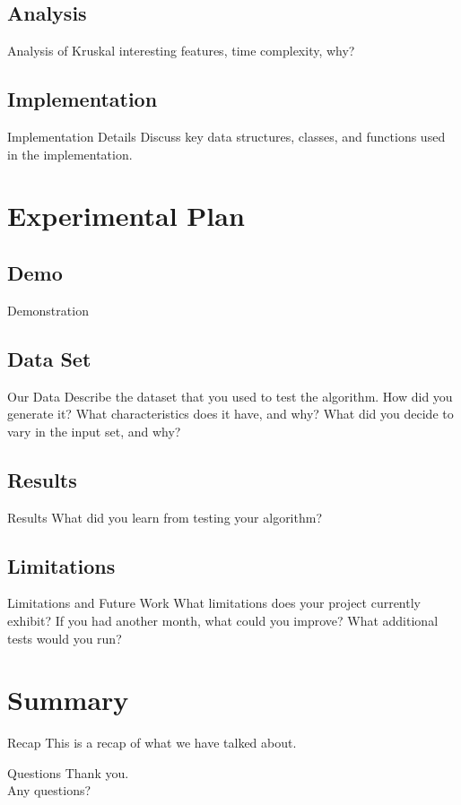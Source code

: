 \documentclass{beamer}
\begin{document}
\subsection{Analysis}
\begin{frame}{Analysis of Kruskal}
    interesting features, time complexity, why?
\end{frame}

\subsection{Implementation}
\begin{frame}{Implementation Details}
    Discuss key data structures, classes, and functions used in the
    implementation.
\end{frame}



\section{Experimental Plan}\frame{\sectionpage}
\subsection{Demo}
\begin{frame}{Demonstration}
\end{frame}

\subsection{Data Set}
\begin{frame}{Our Data}
    Describe the dataset that you used to test the algorithm. How did you
    generate it? What characteristics does it have, and why? What did you
    decide to vary in the input set, and why?
\end{frame}

\subsection{Results}
\begin{frame}{Results}
    What did you learn from testing your algorithm?
\end{frame}

\subsection{Limitations}
\begin{frame}{Limitations and Future Work}
    What limitations does your project currently exhibit? If you had another
    month, what could you improve? What additional tests would you run?
\end{frame}


\section{Summary}\frame{\sectionpage}
\begin{frame}{Recap}
    This is a recap of what we have talked about.
\end{frame}

\begin{frame}{Questions}
    Thank you.\\
    Any questions?
\end{frame}
\end{document}
